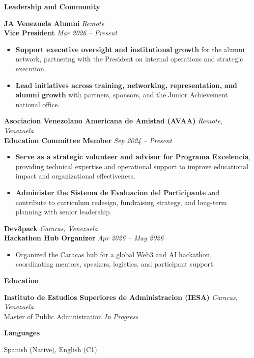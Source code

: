 \documentclass[11pt]{article}
\begin{document}
\vspace{6pt}
\begin{center}
    \textbf{Leadership and Community}
\end{center}
\vspace{-4pt}

\textbf{JA Venezuela Alumni} \hfill \textit{Remote} \\
\textbf{Vice President} \hfill \textit{Mar 2026 -- Present}
\begin{itemize}
    \item \textbf{Support executive oversight and institutional growth} for the alumni network, partnering with the President on internal operations and strategic execution.
    \item \textbf{Lead initiatives across training, networking, representation, and alumni growth} with partners, sponsors, and the Junior Achievement national office.
\end{itemize}

\vspace{6pt}
\textbf{Asociacion Venezolano Americana de Amistad (AVAA)} \hfill \textit{Remote, Venezuela} \\
\textbf{Education Committee Member} \hfill \textit{Sep 2024 -- Present}
\begin{itemize}
    \item \textbf{Serve as a strategic volunteer and advisor for Programa Excelencia}, providing technical expertise and operational support to improve educational impact and organizational effectiveness.
    \item \textbf{Administer the Sistema de Evaluacion del Participante} and contribute to curriculum redesign, fundraising strategy, and long-term planning with senior leadership.
\end{itemize}

\vspace{6pt}
\textbf{Dev3pack} \hfill \textit{Caracas, Venezuela} \\
\textbf{Hackathon Hub Organizer} \hfill \textit{Apr 2026 -- May 2026}
\begin{itemize}
    \item Organized the Caracas hub for a global Web3 and AI hackathon, coordinating mentors, speakers, logistics, and participant support.
\end{itemize}

\vspace{6pt}
\begin{center}
    \textbf{Education}
\end{center}
\vspace{-4pt}
\textbf{Instituto de Estudios Superiores de Administracion (IESA)} \hfill \textit{Caracas, Venezuela} \\
Master of Public Administration \hfill \textit{In Progress}

\vspace{6pt}
\begin{center}
    \textbf{Languages}
\end{center}
\vspace{-4pt}
Spanish (Native), English (C1)
\end{document}
